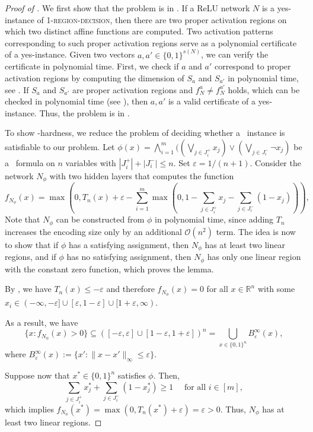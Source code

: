 \documentclass{article}
\begin{document}
\begin{proof}[Proof of ]
We first show that the problem is in \NP.
If a ReLU network $N$ is a yes-instance of \textsc{1-region-decision}, then there are two proper activation regions on which two distinct affine functions are computed.
Two activation patterns corresponding to such proper activation regions serve as a polynomial certificate of a yes-instance.
Given two vectors $a,a'\in \{0,1\}^{s(N)}$, we can verify the certificate in polynomial time.
First, we check if $a$ and $a'$ correspond to proper activation regions by computing the dimension of $S_a$ and $S_{a'}$ in polynomial time, see .
If $S_a$ and $S_{a'}$ are proper activation regions and $f_N^a\neq f_N^{a'}$ holds, which can be checked in polynomial time (see ), then $a,a'$ is a valid certificate of a yes-instance.
Thus, the problem is in \NP.

To show \NP-hardness, we reduce the problem of deciding whether a \SAT\ instance is satisfiable to our problem.
Let $\phi(x)=\bigwedge_{i=1}^m((\bigvee_{j\in J^+_i}x_j) \vee (\bigvee_{j\in J^-_i}\neg x_j) $ be a \SAT\ formula on $n$ variables with $|J^+_i|+|J^-_i|\leq n$.
Set $\varepsilon = 1/(n+1)$.
Consider the network $N_\phi$ with two hidden layers that computes the function
\[
    f_{N_\phi}(x)=\max(0, T_n(x)+\varepsilon-\sum_{i=1}^m \max(0, 1-\sum_{j\in J^+_i}x_j-\sum_{j\in J^-_i}(1-x_j))),
\]
Note that $N_\phi$ can be constructed from $\phi$ in polynomial time, since adding $T_n$ increases the encoding size only by an additional $\mathcal{O}(n^2)$ term.
The idea is now to show that if $\phi$ has a satisfying assignment, then $N_\phi$ has at least two linear regions, and if $\phi$ has no satisfying assignment, then $N_\phi$ has only one linear region with the constant zero function, which proves the lemma.

By , we have $T_n(x)\leq -\varepsilon$ and therefore $f_{N_\phi}(x)=0$ for all $x\in 
\mathbb{R}^n$ with some $x_i\in (-\infty,-\varepsilon]\cup[\varepsilon,1-\varepsilon]\cup [1+\varepsilon,\infty)$.

As a result, we have
\[
\{x: f_{N_\phi}(x)>0\}\subseteq ([-\varepsilon,\varepsilon]\cup [1-\varepsilon, 1+\varepsilon])^n= \bigcup_{x\in \{0,1\}^n}B^\infty_\varepsilon(x),
\]
where $B^\infty_\varepsilon(x):=\{x': \|x-x'\|_\infty \leq \varepsilon\}$.

Suppose now that $x^*\in \{0,1\}^n$ satisfies $\phi$.
Then,
\[
\sum_{j\in J^+_i}x^*_j+\sum_{j\in J^-_i}(1-x^*_j)\geq 1 \quad \text{ for all }i\in [m],
\]
which implies $f_{N_\phi}(x^*)=\max(0, T_n(x^*)+\varepsilon)=\varepsilon>0$.
Thus, $N_\phi$ has at least two linear regions.


\end{proof}
\end{document}
